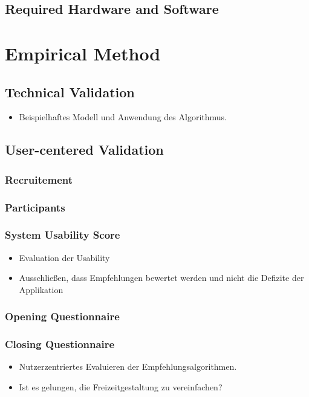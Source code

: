 \documentclass[12pt,numbers=noenddot,parskip,bibliography=totocnumbered,listof=totocnumbered,draft=true]{scrreprt}
\begin{document}
\section{Required Hardware and Software}

\chapter{Empirical Method}

\section{Technical Validation}
\begin{itemize} 
	\item Beispielhaftes Modell und Anwendung des Algorithmus.
\end{itemize} 

\section{User-centered Validation}

\subsection{Recruitement}

\subsection{Participants}

\subsection{System Usability Score}
\begin{itemize} 
	\item Evaluation der Usability
	\item Ausschließen, dass Empfehlungen bewertet werden und nicht die Defizite der Applikation
\end{itemize} 

\subsection{Opening Questionnaire}

\subsection{Closing Questionnaire}
\begin{itemize} 
	\item Nutzerzentriertes Evaluieren der Empfehlungsalgorithmen.
	\item Ist es gelungen, die Freizeitgestaltung zu vereinfachen?
\end{itemize} 
\end{document}
